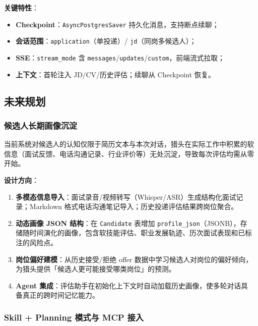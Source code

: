 \documentclass[12pt,a4paper]{ctexart}
\begin{document}
\textbf{关键特性}：

\begin{itemize}[itemsep=2pt]
  \item \textbf{Checkpoint}：\texttt{AsyncPostgresSaver} 持久化消息，支持断点续聊；
  \item \textbf{会话范围}：\texttt{application}（单投递）/ \texttt{jd}（同岗多候选人）；
  \item \textbf{SSE}：\texttt{stream\_mode} 含 \texttt{messages}/\texttt{updates}/\texttt{custom}，前端流式拉取；
  \item \textbf{上下文}：首轮注入 JD/CV/历史评估；续聊从 Checkpoint 恢复。
\end{itemize}

\subsection{未来规划}

\subsubsection{候选人长期画像沉淀}

当前系统对候选人的认知仅限于简历文本与本次对话，猎头在实际工作中积累的软信息（面试反馈、电话沟通记录、行业评价等）无处沉淀，导致每次评估均需从零开始。

\textbf{设计方向}：

\begin{enumerate}[itemsep=4pt]
  \item \textbf{多模态信息导入}：面试录音/视频转写（Whisper/ASR）生成结构化面试记录；Markdown 格式电话沟通笔记导入；历史投递评估结果跨岗位聚合。

  \item \textbf{动态画像 JSON 结构}：在 \texttt{Candidate} 表增加 \texttt{profile\_json}（JSONB），存储随时间演化的画像，包含软技能评估、职业发展轨迹、历次面试表现和已标注的风险点。

  \item \textbf{岗位偏好建模}：从历史接受/拒绝 offer 数据中学习候选人对岗位的偏好倾向，为猎头提供「候选人更可能接受哪类岗位」的预测。

  \item \textbf{Agent 集成}：评估助手在初始化上下文时自动加载历史画像，使多轮对话具备真正的跨时间记忆能力。
\end{enumerate}

\subsubsection{Skill + Planning 模式与 MCP 接入}
\end{document}

